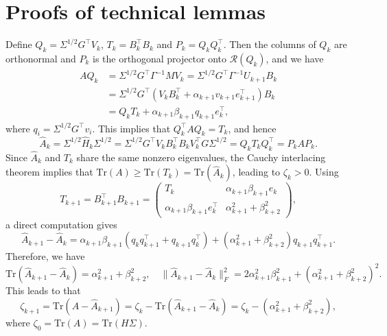 \documentclass[]{myarticle}
\begin{document}
\section{Proofs of technical lemmas}\label{apdx:A}
\begin{proofof}{}
Define $Q_k = \Sigma^{1/2}G^\top V_k$, $T_k = B_k^\top B_k$ and $P_k = Q_kQ_k^\top$. Then the columns of $Q_k$ are orthonormal and $P_k$ is the orthogonal projector onto $\mathcal{R}(Q_k)$, and we have
\begin{align}
  AQ_k &= \Sigma^{1/2}G^\top\Gamma^{-1}MV_k = \Sigma^{1/2}G^\top\Gamma^{-1}U_{k+1}B_k \nonumber \\
  &= \Sigma^{1/2}G^\top(V_kB_k^\top+\alpha_{k+1}v_{k+1}e_{k+1}^\top)B_{k} \nonumber \\
  &= Q_kT_k+\alpha_{k+1}\beta_{k+1}q_{k+1}e_k^\top,  \label{lanczos1}
\end{align}
where \(q_i=\Sigma^{1/2}G^\top v_i\). This implies that $Q_k^\top A Q_k=T_k$, and hence
\begin{equation}\label{A_k}
  \widehat A_k = \Sigma^{1/2}\widehat H_k\Sigma^{1/2}
  = \Sigma^{1/2}G^\top V_k B_k^\top B_k V_k^\top G\Sigma^{1/2}
  = Q_kT_kQ_k^\top = P_kAP_k.
\end{equation}
Since $\widehat A_k$ and $T_k$ share the same nonzero eigenvalues, the Cauchy interlacing theorem implies that $\mathrm{Tr}(A)\geq\mathrm{Tr}(T_k)=\mathrm{Tr}(\widehat{A}_k)$, leading to $\zeta_k>0$.
Using 
\[T_{k+1} = B_{k+1}^\top B_{k+1} =
\begin{pmatrix}
T_k & \alpha_{k+1}\beta_{k+1}e_k\\
\alpha_{k+1}\beta_{k+1}e_k^\top & \alpha_{k+1}^2+\beta_{k+2}^2
\end{pmatrix},\]
a direct computation gives
\begin{equation*}
  \widehat A_{k+1}-\widehat A_k = \alpha_{k+1}\beta_{k+1}(q_kq_{k+1}^\top+q_{k+1}q_k^\top) +(\alpha_{k+1}^2+\beta_{k+2}^2)q_{k+1}q_{k+1}^\top.
\end{equation*}
Therefore, we have
\begin{equation*}
  \mathrm{Tr}(\widehat A_{k+1}-\widehat A_k) = \alpha_{k+1}^2+\beta_{k+2}^2, \quad 
  \|\widehat A_{k+1}-\widehat A_k\|_F^2 = 2\alpha_{k+1}^2\beta_{k+1}^2+(\alpha_{k+1}^2+\beta_{k+2}^2)^2.
\end{equation*}
This leads to that 
\[\zeta_{k+1} = \mathrm{Tr}(A-\widehat A_{k+1}) = \zeta_k-\mathrm{Tr}(\widehat A_{k+1}-\widehat A_k) = \zeta_k-(\alpha_{k+1}^2+\beta_{k+2}^2),\]
where $\zeta_{0}=\mathrm{Tr}(A)=\mathrm{Tr}(H\Sigma)$.


\end{proofof}
\end{document}

